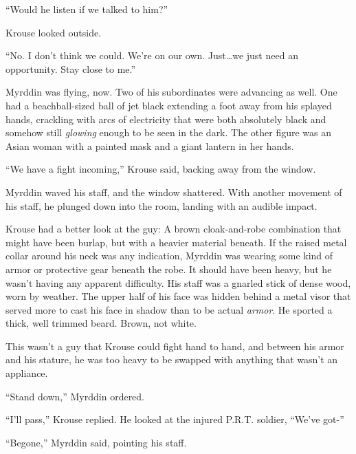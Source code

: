 ``Would he listen if we talked to him?''



Krouse looked outside.



``No.  I don't think we could.  We're on our own.  Just\ldots we just need an opportunity.  Stay close to me.''



Myrddin was flying, now.  Two of his subordinates were advancing as well.  One had a beachball-sized ball of jet black extending a foot away from his splayed hands, crackling with arcs of electricity that were both absolutely black and somehow still \emph{glowing }enough to be seen in the dark.  The other figure was an Asian woman with a painted mask and a giant lantern in her hands.



``We have a fight incoming,'' Krouse said, backing away from the window.



Myrddin waved his staff, and the window shattered.  With another movement of his staff, he plunged down into the room, landing with an audible impact.



Krouse had a better look at the guy:  A brown cloak-and-robe combination that might have been burlap, but with a heavier material beneath.  If the raised metal collar around his neck was any indication, Myrddin was wearing some kind of armor or protective gear beneath the robe.  It should have been heavy, but he wasn't having any apparent difficulty.  His staff was a gnarled stick of dense wood, worn by weather.  The upper half of his face was hidden behind a metal visor that served more to cast his face in shadow than to be actual \emph{armor}.  He sported a thick, well trimmed beard.  Brown, not white.



This wasn't a guy that Krouse could fight hand to hand, and between his armor and his stature, he was too heavy to be swapped with anything that wasn't an appliance.



``Stand down,'' Myrddin ordered.



``I'll pass,'' Krouse replied.  He looked at the injured P.R.T. soldier, ``We've got-''



``Begone,'' Myrddin said, pointing his staff.




